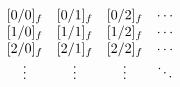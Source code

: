 \[\begin{array}[]{cccc}\mathop{{[0/0]_{f}}\/}\nolimits&\mathop{{[0/1]_{f}}\/}%
\nolimits&\mathop{{[0/2]_{f}}\/}\nolimits&\cdots\\
\mathop{{[1/0]_{f}}\/}\nolimits&\mathop{{[1/1]_{f}}\/}\nolimits&\mathop{{[1/2]%
_{f}}\/}\nolimits&\cdots\\
\mathop{{[2/0]_{f}}\/}\nolimits&\mathop{{[2/1]_{f}}\/}\nolimits&\mathop{{[2/2]%
_{f}}\/}\nolimits&\cdots\\
\vdots&\vdots&\vdots&\ddots\\
\end{array}\]
